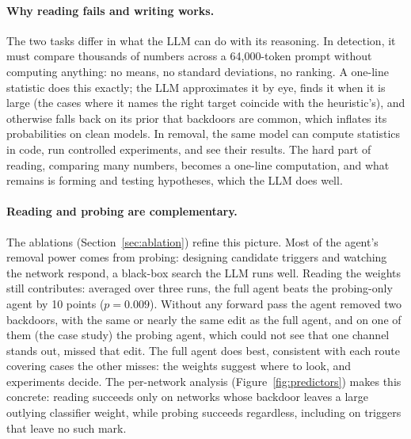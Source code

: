 \documentclass[11pt]{article}
\begin{document}
\paragraph{Why reading fails and writing works.}
The two tasks differ in what the LLM can do with its reasoning. In detection, it must compare
thousands of numbers across a 64{,}000-token prompt without computing anything: no means, no standard
deviations, no ranking. A one-line statistic does this exactly; the LLM approximates it by eye, finds
it when it is large (the cases where it names the right target coincide with the heuristic's), and
otherwise falls back on its prior that backdoors are common, which inflates its probabilities on clean
models. In removal, the same model can compute statistics in code, run controlled experiments, and see
their results. The hard part of reading, comparing many numbers, becomes a one-line computation, and
what remains is forming and testing hypotheses, which the LLM does well.

\paragraph{Reading and probing are complementary.}
The ablations (Section~\ref{sec:ablation}) refine this picture. Most of the agent's removal power comes
from probing: designing candidate triggers and watching the network respond, a black-box search the LLM
runs well. Reading the weights still contributes: averaged over three runs, the full agent beats the
probing-only agent by 10 points ($p=0.009$). Without any forward pass the agent removed two
backdoors, with the same or nearly the same edit as the full agent, and on one of them (the case study)
the probing agent, which could not see that one channel stands out, missed that edit. The full agent does
best, consistent with each route covering cases the other misses: the weights suggest where to look, and
experiments decide. The per-network analysis (Figure~\ref{fig:predictors}) makes this concrete: reading
succeeds only on networks whose backdoor leaves a large outlying classifier weight, while probing succeeds
regardless, including on triggers that leave no such mark.
\end{document}
